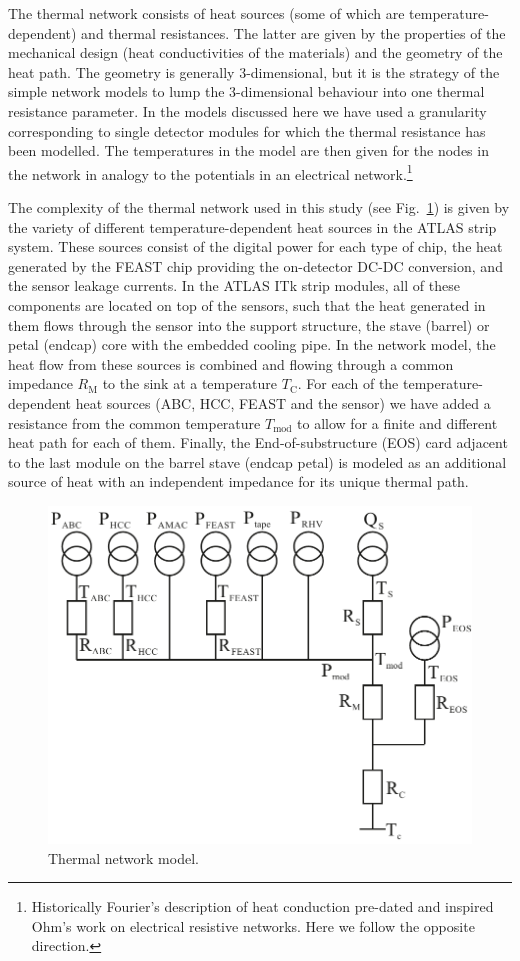 The thermal network consists of heat sources (some of which are temperature-dependent) and thermal resistances. The latter are given by the properties of the mechanical design (heat conductivities of the materials) and the geometry of the heat path. The geometry is generally 3-dimensional, but it is the strategy of the simple network models to lump the 3-dimensional behaviour into one thermal resistance parameter. In the models discussed here we have used a granularity corresponding to single detector modules for which the thermal resistance has been modelled. The temperatures in the model are then given for the nodes in the network in analogy to the potentials in an electrical network.\footnote{Historically Fourier's description of heat conduction pre-dated and inspired Ohm's work on electrical resistive networks. Here we follow the opposite direction.} 

The complexity of the thermal network used in this study (see Fig.~\ref{fig:thermalmodel}) is given by the variety of different temperature-dependent heat sources in the ATLAS strip system. These sources consist of the digital power for each type of chip, the heat generated by the FEAST chip providing the on-detector DC-DC conversion, and the sensor leakage currents. In the ATLAS ITk strip modules, all of these components are located on top of the sensors, such that the heat generated in them flows through the sensor into the support structure, the stave (barrel) or petal (endcap) core with the embedded cooling pipe. In the network model, the heat flow from these sources is combined and flowing through a common impedance $R_\text{M}$ to the sink at a temperature $T_\text{C}$. For each of the temperature-dependent heat sources (ABC, HCC, FEAST and the sensor) we have added a resistance from the common temperature $T_\text{mod}$ to allow for a finite and different heat path for each of them. Finally, the End-of-substructure (EOS) card adjacent to the last module on the barrel stave (endcap petal) is modeled as an additional source of heat with an independent impedance for its unique thermal path. 

\begin{figure}[ht]
\centering
\includegraphics[width=0.6\linewidth]{figures/Thermalmodel.pdf}
\caption{Thermal network model.}
\label{fig:thermalmodel}
\end{figure}

